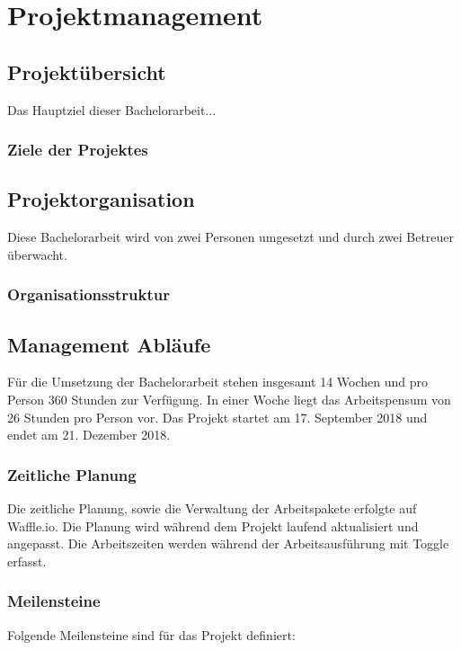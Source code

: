\section{Projektmanagement}

\subsection{Projektübersicht}
Das Hauptziel dieser Bachelorarbeit...

\subsubsection{Ziele der Projektes}


\subsection{Projektorganisation}
Diese Bachelorarbeit wird von zwei Personen umgesetzt und durch zwei Betreuer überwacht.

\subsubsection{Organisationsstruktur}


\subsection{Management Abläufe}
Für die Umsetzung der Bachelorarbeit stehen insgesamt 14 Wochen und pro Person 360 Stunden zur Verfügung. In einer Woche liegt das Arbeitspensum von 26 Stunden pro Person vor. Das Projekt startet am 17. September 2018 und endet am 21. Dezember 2018.

\subsubsection{Zeitliche Planung}
Die zeitliche Planung, sowie die Verwaltung der Arbeitspakete erfolgte auf Waffle.io. Die Planung wird während dem Projekt laufend aktualisiert und angepasst. Die Arbeitszeiten werden während der Arbeitsausführung mit Toggle erfasst.



\subsubsection{Meilensteine}
Folgende Meilensteine sind für das Projekt definiert:



